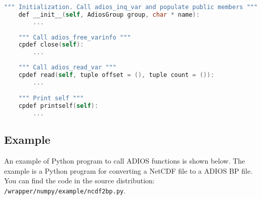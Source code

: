 \begin{lstlisting}[language=C,frame=single, backgroundcolor=\color{gray85},caption={Write functions},label={},]
    """ Initialization. Call adios_inq_var and populate public members """
    def __init__(self, AdiosGroup group, char * name):
        ...
        
    """ Call adios_free_varinfo """
    cpdef close(self):
        ...
        
    """ Call adios_read_var """
    cpdef read(self, tuple offset = (), tuple count = ()):
        ...

    """ Print self """
    cpdef printself(self):
        ...

\end{lstlisting}

\subsection{Example}
An example of Python program to call ADIOS functions is shown below. The example is a Python program for converting a NetCDF file to a ADIOS BP file. You can find the code in the source distribution: \verb+/wrapper/numpy/example/ncdf2bp.py+.

